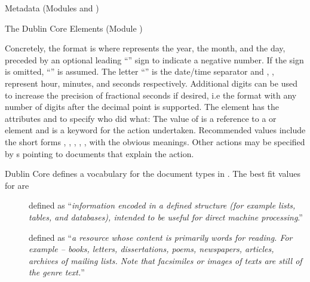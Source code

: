 \begin{tchapter}[id=metadata,short=Metadata]{Metadata (Modules {} and  {})}
\begin{tsection}[id=dc-elements]{The Dublin Core Elements (Module {})}
\begin{description}
  Concretely, the format is
  {}
  where {} represents the year, {} the month, and {}
  the day, preceded by an optional leading ``{\snippet{-}}'' sign to indicate a negative
  number. If the sign is omitted, ``{\snippet{+}}'' is assumed.  The letter
  ``{}'' is the date/time separator and {}, {},
  {} represent hour, minutes, and seconds respectively.  Additional digits can
  be used to increase the precision of fractional seconds if desired, i.e the format
  {} with any number of digits after the decimal
  point is supported.  The {} element has the attributes
  {} and {} to specify
  who did what: The value of {} is a reference to a
  {} or {} element and
  {} is a keyword for the action
  undertaken. Recommended values include the short forms
  {},
  {},
  {},
  {},
  {},
  {} with the obvious meanings. Other actions may
  be specified by {s} pointing to documents that explain the action.
\item[{\element[ns-elt=dc]{type}}] Dublin Core defines a vocabulary for the document types
  in {\cite{DCMI:dtv03}}. The best fit values for {\omdoc} are
  \begin{description}
  \item[{}]
    defined as ``{\emph{information encoded in a defined structure (for example lists,
      tables, and databases), intended to be useful for direct machine processing}}.''
  \item[{}] defined as
    ``{\emph{a resource whose content is primarily words for reading. For example -- books,
      letters, dissertations, poems, newspapers, articles, archives of mailing lists. Note
      that facsimiles or images of texts are still of the genre text.}}''
  \item[{}]
\end{description}
\end{description}
\end{tsection}
\end{tchapter}
